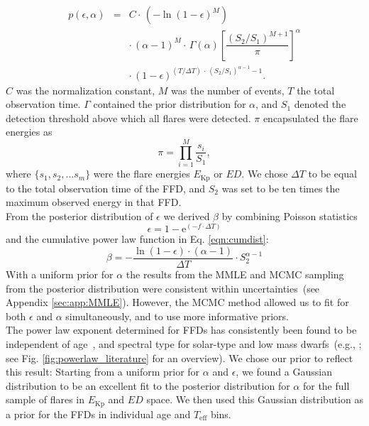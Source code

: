 \documentclass{aa}
\begin{document}
\begin{eqnarray}
\label{joint_posterior}
p(\epsilon, \alpha) &=& C \cdot\, (-\ln(1 - \epsilon)^{M})\nonumber\\
                    && \cdot\, (\alpha-1)^M \cdot\, \Gamma(\alpha) \left[\dfrac{(S_2 / S_1)^{M+1}}{\pi} \right]^{\alpha}\nonumber\\
                    && \cdot\, (1-\epsilon)^{(T / \Delta T) \,\cdot\, (S_2 /S_1)^{\alpha-1} -1 }.
\end{eqnarray}
$C$ was the normalization constant, $M$ was the number of events, $T$ the total observation time. $\Gamma$ contained the prior distribution for $\alpha$, and $S_1$ denoted the detection threshold above which all flares were detected. $\pi$ encapsulated the flare energies as
\begin{equation}
    \pi = \displaystyle \prod_{i=1}^M \dfrac{s_i}{S_1},
\end{equation}
where $\{s_1,s_2,...s_m\}$ were the flare energies $E_\mathrm{Kp}$ or $ED$. We chose $\Delta T$ to be equal to the total observation time of the FFD, and $S_2$ was set to be ten times the maximum observed energy in that FFD.
\\
From the posterior distribution of $\epsilon$ we derived $\beta$ by combining Poisson statistics 
\begin{equation}
\epsilon = 1 - \mathrm{e}^{(-f\cdot\Delta T)}
\label{poissonstats}
\end{equation}
and the cumulative power law function in Eq. \ref{eqn:cumdist}:
\begin{equation}
\beta = - \dfrac{\ln(1 - \epsilon)\cdot (\alpha -1)}{\Delta T} \cdot S_2^{\alpha -1}
\label{eqn:epstobeta}
\end{equation}
With a uniform prior for $\alpha$ the results from the MMLE and MCMC sampling from the posterior distribution were consistent within uncertainties~(see Appendix \ref{sec:app:MMLE}). However, the MCMC method allowed us to fit for both $\epsilon$ and $\alpha$ simultaneously, and to use more informative priors. 
\\
The power law exponent determined for FFDs has consistently been found to be independent of age~\citep{davenport2019}, and spectral type for solar-type and low mass dwarfs~(e.g., \citealt{chang2015, howard2019, lin2019}; see Fig. \ref{fig:powerlaw_literature} for an overview). We chose our prior to reflect this result: Starting from a uniform prior for $\alpha$ and $\epsilon$, we found a Gaussian distribution to be an excellent fit to the posterior distribution for $\alpha$ for the full sample of flares in $E_\mathrm{Kp}$ and $ED$ space. We then used this Gaussian distribution as a prior for the FFDs in individual age and $T_\mathrm{eff}$ bins. 
\end{document}
